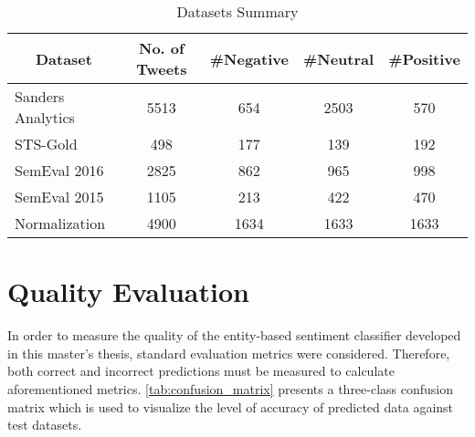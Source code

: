 \begin{table}[H]
\centering
\caption{Datasets Summary}
\label{tab:datasets_summary}
\begin{tabular}{|l|c|c|c|c|}
\hline
\multicolumn{1}{|c|}{{\color[HTML]{000000} \textbf{Dataset}}} & {\color[HTML]{000000} \textbf{No. of Tweets}} & \textbf{\#Negative} & \textbf{\#Neutral} & \textbf{\#Positive} \\ \hline
{\color[HTML]{000000} Sanders Analytics}                      & {\color[HTML]{000000} 5513}                   & 654                 & 2503               & 570                 \\ \hline
STS-Gold                                                      & 498                                           & 177                 & 139                & 192                 \\ \hline
SemEval 2016                                                  & 2825                                          & 862                 & 965                & 998                 \\ \hline
SemEval 2015                                                  & 1105                                          & 213                 & 422                & 470                 \\ \hline
Normalization                                                 & 4900                                          & 1634                & 1633               & 1633                \\ \hline
\end{tabular}
\end{table}


\section{Quality Evaluation}
In order to measure the quality of the entity-based sentiment classifier developed in this master's thesis, standard evaluation metrics were considered. Therefore, both correct and incorrect predictions must be measured to calculate aforementioned metrics. \autoref{tab:confusion_matrix} presents a three-class confusion matrix which is used to visualize the level of accuracy of predicted data against test datasets.   


